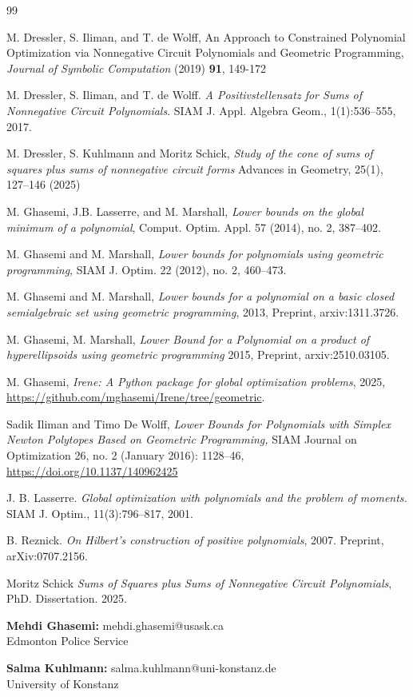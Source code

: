 \documentclass{article}
\begin{document}
\begin{thebibliography}{99}

 M. Dressler, S. Iliman, and T. de Wolff, An Approach to Constrained Polynomial Optimization via Nonnegative Circuit Polynomials and Geometric Programming, \emph{Journal of Symbolic Computation} (2019) \textbf{91}, 149-172

 M. Dressler, S. Iliman, and T. de Wolff. \emph{A Positivstellensatz for Sums of Nonnegative Circuit Polynomials}. SIAM J. Appl. Algebra Geom., 1(1):536--555, 2017.

 M. Dressler, S. Kuhlmann and Moritz Schick, \emph{Study of the cone of sums of squares plus sums of nonnegative circuit forms} Advances in Geometry, 25(1), 127--146 (2025)

 M. Ghasemi, J.B. Lasserre, and M. Marshall, \emph{Lower bounds on the global minimum of a polynomial}, Comput. Optim. Appl. 57 (2014), no. 2, 387--402.

 M. Ghasemi and M. Marshall, \emph{Lower bounds for polynomials using geometric programming}, SIAM J. Optim. 22 (2012), no. 2, 460--473.

 M. Ghasemi and M. Marshall, \emph{Lower bounds for a polynomial on a basic closed semialgebraic set using geometric programming}, 2013, Preprint, arxiv:1311.3726.

 M. Ghasemi, M. Marshall, \emph{Lower Bound for a Polynomial on a product of hyperellipsoids using geometric programming} 2015, Preprint, arxiv:2510.03105.

 M. Ghasemi, \emph{Irene: A Python package for global optimization problems}, 2025, \url{https://github.com/mghasemi/Irene/tree/geometric}.

 Sadik Iliman and Timo De Wolff, \emph{Lower Bounds for Polynomials with Simplex Newton Polytopes Based on Geometric Programming,} SIAM Journal on Optimization 26, no. 2 (January 2016): 1128--46, \url{https://doi.org/10.1137/140962425}

 J. B. Lasserre. \emph{Global optimization with polynomials and the problem of moments.} SIAM J. Optim., 11(3):796--817, 2001.

 B. Reznick. \emph{On Hilbert's construction of positive polynomials}, 2007. Preprint, arXiv:0707.2156.

 Moritz Schick \emph{Sums of Squares plus Sums of Nonnegative Circuit Polynomials}, PhD. Dissertation. 2025.

\end{thebibliography}

\bigskip

\noindent\textbf{Mehdi Ghasemi:} mehdi.ghasemi@usask.ca\\
Edmonton Police Service

\noindent\textbf{Salma Kuhlmann:} salma.kuhlmann@uni-konstanz.de\\
University of Konstanz
\end{document}
